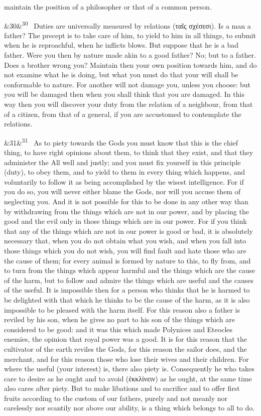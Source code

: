 \documentclass[12pt]{article}
\newcommand{\para}[1][]{\par\noindent\ifx&#1&\else\textsuperscript{\footnotesize #1}~\fi}
\begin{document}
maintain the position of a philosopher or that of a common person.

\para[30] Duties are universally measured by relations (ταῖς σχέσεσι). Is a man a father? The precept is to take care of him, to yield to him in all things, to submit when he is reproachful, when he inflicts blows. But suppose that he is a bad father. Were you then by nature made akin to a good father? No; but to a father. Does a brother wrong you? Maintain then your own position towards him, and do not examine what he is doing, but what you must do that your will shall be conformable to nature. For another will not damage you, unless you choose: but you will be damaged then when you shall think that you are damaged. In this way then you will discover your duty from the relation of a neighbour, from that of a citizen, from that of a general, if you are accustomed to contemplate the relations.

\para[31] As to piety towards the Gods you must know that this is the chief thing, to have right opinions about them, to think that they exist, and that they administer the All well and justly; and you must fix yourself in this principle (duty), to obey them, and to yield to them in every thing which happens, and voluntarily to follow it as being accomplished by the wisest intelligence. For if you do so, you will never either blame the Gods, nor will you accuse them of neglecting you. And it is not possible for this to be done in any other way than by withdrawing from the things which are not in our power, and by placing the good and the evil only in those things which are in our power. For if you think that any of the things which are not in our power is good or bad, it is absolutely necessary that, when you do not obtain what you wish, and when you fall into those things which you do not wish, you will find fault and hate those who are the cause of them; for every animal is formed by nature to this, to fly from, and to turn from the things which appear harmful and the things which are the cause of the harm, but to follow and admire the things which are useful and the causes of the useful. It is impossible then for a person who thinks that he is harmed to be delighted with that which he thinks to be the cause of the harm, as it is also impossible to be pleased with the harm itself. For this reason also a father is reviled by his son, when he gives no part to his son of the things which are considered to be good: and it was this which made Polynices and Eteocles enemies, the opinion that royal power was a good. It is for this reason that the cultivator of the earth reviles the Gods, for this reason the sailor does, and the merchant, and for this reason those who lose their wives and their children. For where the useful (your interest) is, there also piety is. Consequently he who takes care to desire as he ought and to avoid (ἐκκλίνειν) as he ought, at the same time also cares after piety. But to make libations and to sacrifice and to offer first fruits according to the custom of our fathers, purely and not meanly nor carelessly nor scantily nor above our ability, is a thing which belongs to all to do.
\end{document}

